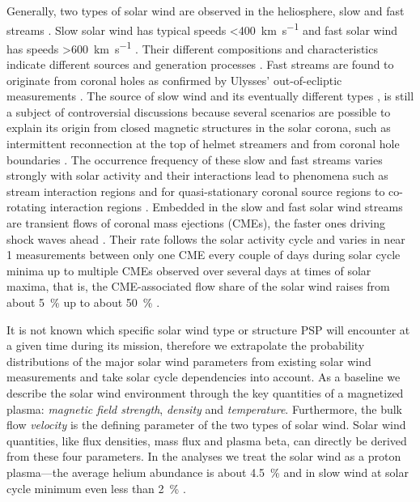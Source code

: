 Generally, two types of solar wind are observed in the heliosphere, slow and fast streams \citep{Neugebauer1966,Schwenn1983}. Slow solar wind has typical speeds \SI{<400}{\km\per\s} and fast solar wind has speeds \SI{>600}{\km\per\s} \citep[p.~144]{Schwenn1990}. Their different compositions and characteristics indicate different sources and generation processes \citep{McGregor2011a}. Fast streams are found to originate from coronal holes as confirmed by Ulysses' out-of-ecliptic measurements \citep{McComas1998}. The source of slow wind and its eventually different types \citep{Schwenn1983}, is still a subject of controversial discussions because several scenarios are possible to explain its origin from closed magnetic structures in the solar corona, such as intermittent reconnection at the top of helmet streamers and from coronal hole boundaries \citep{Kilpua2016}. The occurrence frequency of these slow and fast streams varies strongly with solar activity and their interactions lead to phenomena such as stream interaction regions and for quasi-stationary coronal source regions to co-rotating interaction regions \citep{Balogh1999}.
Embedded in the slow and fast solar wind streams are transient flows of coronal mass ejections (CMEs), the faster ones driving shock waves ahead \citep{Gosling1974}. Their rate follows the solar activity cycle and varies in near \SI{1}{\au} measurements between only one CME every couple of days during solar cycle minima up to multiple CMEs observed over several days at times of solar maxima, that is, the CME-associated flow share of the solar wind raises from about \SI{5}{\percent} up to about \SI{50}{\percent} \citep{Richardson2012}.

It is not known which specific solar wind type or structure PSP will encounter at a given time during its mission, therefore we extrapolate the probability distributions of the major solar wind parameters from existing solar wind measurements and take solar cycle dependencies into account.
As a baseline we describe the solar wind environment through the key quantities of a magnetized plasma: \textit{magnetic field strength}, \textit{density} and \textit{temperature}. Furthermore, the bulk flow \textit{velocity} is the defining parameter of the two types of solar wind. Solar wind quantities, like flux densities, mass flux and plasma beta, can directly be derived from these four parameters. In the analyses we treat the solar wind as a proton plasma---the average helium abundance is about \SI{4.5}{\percent} and in slow wind at solar cycle minimum even less than \SI{2}{\percent} \citep{Feldman1978,Schwenn1983,Kasper2012}.

